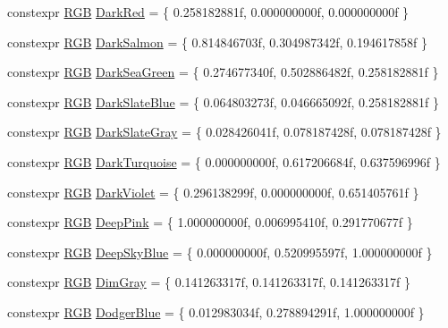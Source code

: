 \begin{DoxyCompactItemize}
\item 
constexpr \mbox{\hyperlink{structmage_1_1_r_g_b}{R\+GB}} \mbox{\hyperlink{namespacemage_1_1color_af3e92bec90aaaae7e505af23ff81ecdf}{Dark\+Red}} = \{ 0.\+258182881f, 0.\+000000000f, 0.\+000000000f \}
\item 
constexpr \mbox{\hyperlink{structmage_1_1_r_g_b}{R\+GB}} \mbox{\hyperlink{namespacemage_1_1color_ab179d9d88e39d4aab420b3b5c774b416}{Dark\+Salmon}} = \{ 0.\+814846703f, 0.\+304987342f, 0.\+194617858f \}
\item 
constexpr \mbox{\hyperlink{structmage_1_1_r_g_b}{R\+GB}} \mbox{\hyperlink{namespacemage_1_1color_a1e835bd8a981b6e1d26267e774b32c74}{Dark\+Sea\+Green}} = \{ 0.\+274677340f, 0.\+502886482f, 0.\+258182881f \}
\item 
constexpr \mbox{\hyperlink{structmage_1_1_r_g_b}{R\+GB}} \mbox{\hyperlink{namespacemage_1_1color_a5dad9107a42e3b57733617d884850bce}{Dark\+Slate\+Blue}} = \{ 0.\+064803273f, 0.\+046665092f, 0.\+258182881f \}
\item 
constexpr \mbox{\hyperlink{structmage_1_1_r_g_b}{R\+GB}} \mbox{\hyperlink{namespacemage_1_1color_ac2267d00e970246ed57ab091410f3d0b}{Dark\+Slate\+Gray}} = \{ 0.\+028426041f, 0.\+078187428f, 0.\+078187428f \}
\item 
constexpr \mbox{\hyperlink{structmage_1_1_r_g_b}{R\+GB}} \mbox{\hyperlink{namespacemage_1_1color_a4717affd7c87b2f89b9e461b16510f56}{Dark\+Turquoise}} = \{ 0.\+000000000f, 0.\+617206684f, 0.\+637596996f \}
\item 
constexpr \mbox{\hyperlink{structmage_1_1_r_g_b}{R\+GB}} \mbox{\hyperlink{namespacemage_1_1color_adb191fa4601ac336db967a8ec301370f}{Dark\+Violet}} = \{ 0.\+296138299f, 0.\+000000000f, 0.\+651405761f \}
\item 
constexpr \mbox{\hyperlink{structmage_1_1_r_g_b}{R\+GB}} \mbox{\hyperlink{namespacemage_1_1color_aa68a1c007257021aa438e5ad8251e0b1}{Deep\+Pink}} = \{ 1.\+000000000f, 0.\+006995410f, 0.\+291770677f \}
\item 
constexpr \mbox{\hyperlink{structmage_1_1_r_g_b}{R\+GB}} \mbox{\hyperlink{namespacemage_1_1color_a6a122d439d2206202dc3078cf8bb645f}{Deep\+Sky\+Blue}} = \{ 0.\+000000000f, 0.\+520995597f, 1.\+000000000f \}
\item 
constexpr \mbox{\hyperlink{structmage_1_1_r_g_b}{R\+GB}} \mbox{\hyperlink{namespacemage_1_1color_a74d9b984f9bc60a90b9d7eb6debce8ca}{Dim\+Gray}} = \{ 0.\+141263317f, 0.\+141263317f, 0.\+141263317f \}
\item 
constexpr \mbox{\hyperlink{structmage_1_1_r_g_b}{R\+GB}} \mbox{\hyperlink{namespacemage_1_1color_ad5375c3554ad1719cb3cb199ad0eb9ee}{Dodger\+Blue}} = \{ 0.\+012983034f, 0.\+278894291f, 1.\+000000000f \}

\end{DoxyCompactItemize}
